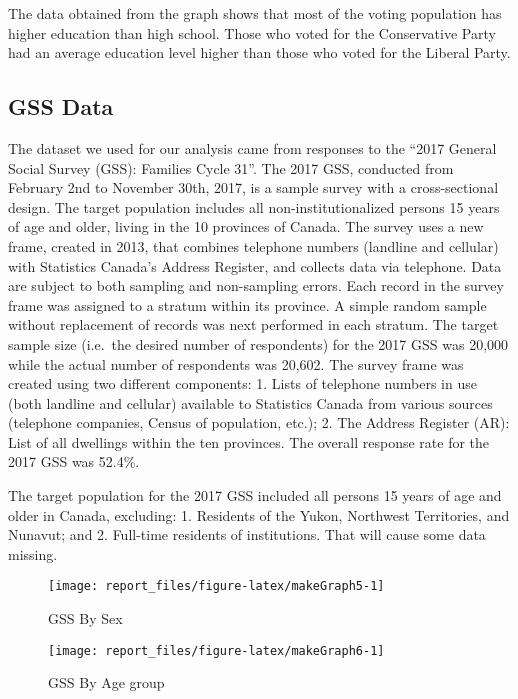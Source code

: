 \documentclass[
  12pt,
]{article}
\begin{document}
The data obtained from the graph shows that most of the voting
population has higher education than high school. Those who voted for
the Conservative Party had an average education level higher than those
who voted for the Liberal Party.

\hypertarget{gss-data}{%
\subsection{GSS Data}\label{gss-data}}

The dataset we used for our analysis came from responses to the ``2017
General Social Survey (GSS): Families Cycle 31''. The 2017 GSS,
conducted from February 2nd to November 30th, 2017, is a sample survey
with a cross-sectional design. The target population includes all
non-institutionalized persons 15 years of age and older, living in the
10 provinces of Canada. The survey uses a new frame, created in 2013,
that combines telephone numbers (landline and cellular) with Statistics
Canada's Address Register, and collects data via telephone. Data are
subject to both sampling and non-sampling errors. Each record in the
survey frame was assigned to a stratum within its province. A simple
random sample without replacement of records was next performed in each
stratum. The target sample size (i.e.~the desired number of respondents)
for the 2017 GSS was 20,000 while the actual number of respondents was
20,602. The survey frame was created using two different components: 1.
Lists of telephone numbers in use (both landline and cellular) available
to Statistics Canada from various sources (telephone companies, Census
of population, etc.); 2. The Address Register (AR): List of all
dwellings within the ten provinces. The overall response rate for the
2017 GSS was 52.4\%.

The target population for the 2017 GSS included all persons 15 years of
age and older in Canada, excluding: 1. Residents of the Yukon, Northwest
Territories, and Nunavut; and 2. Full-time residents of institutions.
That will cause some data missing.

\begin{figure}
\texttt{[image: report\_files/figure-latex/makeGraph5-1]} \caption{GSS By Sex}\label{fig:makeGraph5}
\end{figure}

\begin{figure}
\texttt{[image: report\_files/figure-latex/makeGraph6-1]} \caption{GSS By Age group}\label{fig:makeGraph6}
\end{figure}
\end{document}
